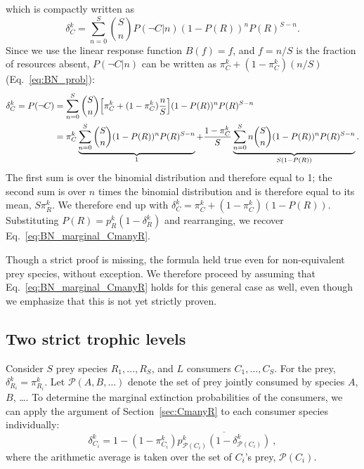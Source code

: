 \documentclass[11pt]{article}
\newcommand{\ol}[1]{\overline{#1}}
\let\originalleft\left
\let\originalright\right
\renewcommand{\left}{\mathopen{}\mathclose\bgroup\originalleft}
\renewcommand{\right}{\aftergroup\egroup\originalright}
\begin{document}
which is compactly written as
\begin{equation}
  \label{eq:BN_marginal_twolayer_3}
  \delta_C^k = \sum_{n=0}^S \binom{S}{n} P(\neg C|n) (1-P(R))^n P(R)^{S-n} .
\end{equation}
Since we use the linear response function $B(f) = f$, and $f = n/S$ is the fraction of resources absent, $P(\neg C|n)$ can be written as $\pi_C^k + (1-\pi_C^k) (n / S)$ (Eq.~\ref{eq:BN_prob}):
\begin{equation}
  \label{eq:BN_marginal_twolayer_4}
  \begin{split}
    \delta_C^k = P(\neg C) &= \sum_{n=0}^S \binom{S}{n} \left[ \pi_C^k +
      (1-\pi_C^k) \frac{n}{S} \right] (1-P(R))^n P(R)^{S-n}
    \\ &= \pi_C^k \underbrace{\sum_{n=0}^S \binom{S}{n} (1-P(R))^n
      P(R)^{S-n}}_{1} + \frac{1-\pi_C^k}{S} \underbrace{\sum_{n=0}^S
      n \binom{S}{n} (1-P(R))^n P(R)^{S-n}}_{S (1-P(R))} .
  \end{split}
\end{equation}
The first sum is over the binomial distribution and therefore equal to 1; the second sum is over $n$ times the binomial distribution and is therefore equal to its mean, $S \pi_R^k$. We therefore end up with $\delta_C^k = \pi_C^k + (1 - \pi_C^k) (1 - P(R))$. Substituting $P(R) = p_{R}^k (1 - \delta_R^k)$ and rearranging, we recover Eq.~\ref{eq:BN_marginal_CmanyR}.

Though a strict proof is missing, the formula held true even for non-equivalent prey species, without exception. We therefore proceed by assuming that Eq.~\ref{eq:BN_marginal_CmanyR} holds for this general case as well, even though we emphasize that this is not yet strictly proven.

\subsection{Two strict trophic levels} \label{sec:2level}

Consider $S$ prey species $R_1,\ldots, R_S$, and $L$ consumers $C_1,\ldots,C_S$. For the prey, $\delta_{R_i}^k = \pi_{R_i}^k$. Let $\mathcal{P}(A,B,\ldots)$ denote the set of prey jointly consumed by species $A$, $B$, \ldots. To determine the marginal extinction probabilities of the consumers, we can apply the argument of Section~\ref{sec:CmanyR} to each consumer species individually:
\begin{equation}
  \label{eq:BN_marginal_twolevel_C}
  \delta_{C_i}^k = 1 - (1 - \pi_{C_i}^k) \ol{p_{\mathcal{P}(C_i)}^k
    (1 - \delta_{\mathcal{P}(C_i)}^k)} \ ,
\end{equation}
where the arithmetic average is taken over the set of $C_i$'s prey, $\mathcal{P}(C_i)$.
\end{document}
